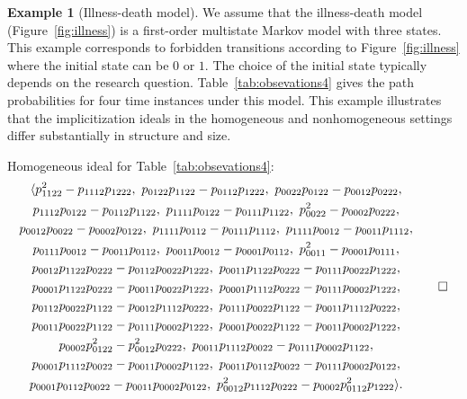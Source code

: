 \documentclass[11pt, a4paper]{article}
\numberwithin{equation}{section}
\theoremstyle{plain}
\theoremstyle{definition}
\newtheorem{example}{Example}
\begin{document}
\begin{example}[Illness-death model] \label{example:illness_death_model}
We assume that the illness-death model (Figure~\ref{fig:illness}) is a first-order multistate Markov model with three states.  This example corresponds to forbidden transitions according to Figure~\ref{fig:illness} where the initial state can be $0$ or $1$. The choice of the initial state typically depends on the research question. Table~\ref{tab:obsevations4} gives the path probabilities for four time instances under this model.
This example illustrates that the implicitization ideals in the homogeneous and nonhomogeneous settings differ substantially in structure and size.



Homogeneous ideal for Table~\ref{tab:obsevations4}:
\begin{equation*}
\begin{gathered}
 \langle p_{1 1 2 2}^2-p_{1 1 1 2}p_{1 2 2 2},\ p_{0 1 2 2}p_{1 1 2 2}-p_{0 1 1 2}p_{1 2 2 2},\ p_{0 0 2 2}p_{0 1 2 2}-p_{0 0 1 2}p_{0 2 2 2},\\
  p_{1 1 1 2}p_{0 1 2 2}-p_{01 1 2}p_{1 1 2 2},\ p_{1 1 1 1}p_{0 1 2 2}-p_{0 1 1 1}p_{1 1 2 2},\ p_{0 0 2 2}^2-p_{0 0 0 2}p_{0 2 2 2},\\
  p_{0 0 1 2}p_{0 0 2 2}-p_{0 0 0 2}p_{0 1 2 2},\ p_{1 1 11}p_{0 1 1 2}-p_{0 1 1 1}p_{1 1 1 2},\ p_{1 1 1 1}p_{0 0 1 2}-p_{0 0 1 1}p_{1 1 1 2},\\
  p_{0 1 1 1}p_{0 0 1 2}-p_{0 0 1 1}p_{0 1 1 2},\ p_{0 0 1 1}p_{0 0 1 2}-p_{00 0 1}p_{0 1 1 2},\ p_{0 0 1 1}^2-p_{0 0 0 1}p_{0 1 1 1},\\
  p_{0 0 1 2}p_{1 1 2 2}p_{0 2 2 2}-p_{0 1 1 2}p_{0 0 2 2}p_{1 2 2 2},\ p_{0 0 1 1}p_{1 1 2 2}p_{0 2 22}-p_{0 1 1 1}p_{0 0 2 2}p_{1 2 2 2},\\
  p_{0 0 0 1}p_{1 1 2 2}p_{0 2 2 2}-p_{0 0 1 1}p_{0 0 2 2}p_{1 2 2 2},\ p_{0 0 0 1}p_{1 1 1 2}p_{0 2 2 2}-p_{0 1 1 1}p_{0 00 2}p_{1 2 2 2},\\
  p_{0 1 1 2}p_{0 0 2 2}p_{1 1 2 2}-p_{0 0 1 2}p_{1 1 1 2}p_{0 2 2 2},\ p_{0 1 1 1}p_{0 0 2 2}p_{1 1 2 2}-p_{0 0 1 1}p_{1 1 1 2}p_{0 2 2 2},\\
  p_{00 1 1}p_{0 0 2 2}p_{1 1 2 2}-p_{0 1 1 1}p_{0 0 0 2}p_{1 2 2 2},\ p_{0 0 0 1}p_{0 0 2 2}p_{1 1 2 2}-p_{0 0 1 1}p_{0 0 0 2}p_{1 2 2 2},\\
  p_{0 0 0 2}p_{0 1 22}^2-p_{0 0 1 2}^2p_{0 2 2 2},\ p_{0 0 1 1}p_{1 1 1 2}p_{0 0 2 2}-p_{0 1 1 1}p_{0 0 0 2}p_{1 1 2 2},\\
  p_{0 0 0 1}p_{1 1 1 2}p_{0 0 2 2}-p_{0 0 1 1}p_{0 0 0 2}p_{11 2 2},\ p_{0 0 1 1}p_{0 1 1 2}p_{0 0 2 2}-p_{0 1 1 1}p_{0 0 0 2}p_{0 1 2 2},\\
  p_{0 0 0 1}p_{0 1 1 2}p_{0 0 2 2}-p_{0 0 1 1}p_{0 0 0 2}p_{0 1 2 2},\ p_{0 0 12}^2p_{1 1 1 2}p_{0 2 2 2}-p_{0 0 0 2}p_{0 1 1 2}^2p_{1 2 2 2}\rangle.
\end{gathered}
\qedhere\end{equation*}




\end{example}
\end{document}
